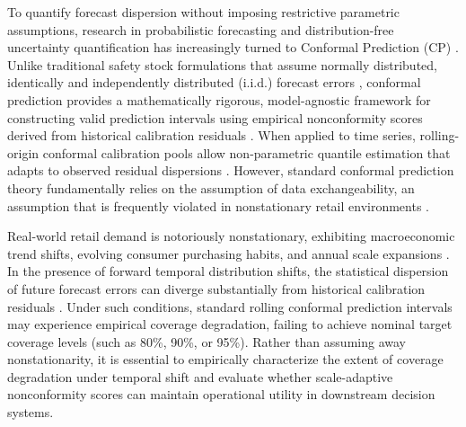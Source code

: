 To quantify forecast dispersion without imposing restrictive parametric assumptions, research in probabilistic forecasting and distribution-free uncertainty quantification has increasingly turned to Conformal Prediction (CP) \cite{vovk2005algorithmic, angelopoulos2021gentle}. Unlike traditional safety stock formulations that assume normally distributed, identically and independently distributed (i.i.d.) forecast errors \cite{silver1998inventory}, conformal prediction provides a mathematically rigorous, model-agnostic framework for constructing valid prediction intervals using empirical nonconformity scores derived from historical calibration residuals \cite{stankeviciute2021conformal}. When applied to time series, rolling-origin conformal calibration pools allow non-parametric quantile estimation that adapts to observed residual dispersions \cite{huber2019integrating}. However, standard conformal prediction theory fundamentally relies on the assumption of data exchangeability, an assumption that is frequently violated in nonstationary retail environments \cite{barber2023conformal}.

Real-world retail demand is notoriously nonstationary, exhibiting macroeconomic trend shifts, evolving consumer purchasing habits, and annual scale expansions \cite{malik2024sales}. In the presence of forward temporal distribution shifts, the statistical dispersion of future forecast errors can diverge substantially from historical calibration residuals \cite{tibshirani2019conformal}. Under such conditions, standard rolling conformal prediction intervals may experience empirical coverage degradation, failing to achieve nominal target coverage levels (such as 80\%, 90\%, or 95\%). Rather than assuming away nonstationarity, it is essential to empirically characterize the extent of coverage degradation under temporal shift and evaluate whether scale-adaptive nonconformity scores can maintain operational utility in downstream decision systems.

